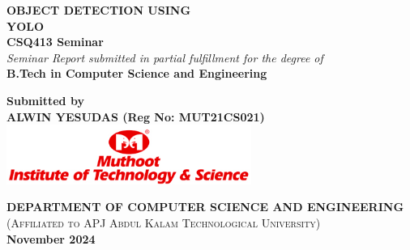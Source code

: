 \documentclass[a4paper,12pt]{template}
\begin{document}
\begin{titlepage}
    \centering
    \vspace*{2cm}
    {\Huge \textbf{OBJECT DETECTION USING }}\\[0.5cm]
    {\Huge \textbf{YOLO}}\\[2cm]

    {\Large \textbf{CSQ413 Seminar}}\\[1cm]
    
    \textit{Seminar Report submitted in partial fulfillment for the degree of}\\
    {\Large \textbf{B.Tech in Computer Science and Engineering}}\\[1cm]
    
    \vfill %
    
    {\Large \textbf{Submitted by}}\\
    {\Large \textbf{ALWIN YESUDAS (Reg No: MUT21CS021)}}\\[1cm]
    
    \includegraphics[width=0.6\textwidth]{images/Mits Logo.jpg}
    
    \vspace{0.5cm}
    {\Large \textbf{DEPARTMENT OF COMPUTER SCIENCE AND ENGINEERING}}\\[0.5cm]
    \small\textsc{(Affiliated to APJ Abdul Kalam Technological University)}\\[0.3cm]
    
    {\large \textbf{November 2024}} 
\end{titlepage}

\newpage
\thispagestyle{plain}
\end{document}
